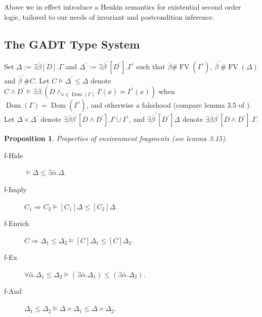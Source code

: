 \documentclass{article}
\newcommand{\assign}{:=}
\newcommand{\tmop}[1]{\ensuremath{\operatorname{#1}}}
\newtheorem{proposition}{Proposition}
\begin{document}
Above we in effect introduce a Henkin semantics for existential second order
logic, tailored to our needs of invariant and postcondition inference.

\subsection{The GADT Type System}\label{GADTProofs}

Set $\Delta \assign \exists \bar{\beta} [D] . \Gamma$ and $\Delta^{\prime}
\assign \exists \bar{\beta}^{\prime} [D^{\prime}] . \Gamma^{\prime}$ such that
$\bar{\beta} \# \tmop{FV} (\Gamma^{\prime})$, $\bar{\beta}^{\prime} \#
\tmop{FV} (\Delta)$ and $\bar{\beta}^{\prime} \#C$. Let $C \vDash
\Delta^{\prime} \leqslant \Delta$ denote $C \wedge D^{\prime} \vDash \exists
\bar{\beta} . (D \wedge_{x \in \tmop{Dom} (\Gamma)} \Gamma (x) \dot{=}
\Gamma^{\prime} (x))$ when $\tmop{Dom} (\Gamma) = \tmop{Dom}
(\Gamma^{\prime})$, and otherwise a falsehood (compare lemma 3.5 of
{\cite{simonet-pottier-hmg-toplas}}). Let $\Delta \times \Delta^{\prime}$
denote $\exists \bar{\beta} \overline{\beta^{\prime}} [D \wedge D^{\prime}] .
\Gamma \dot{\cup} \Gamma^{\prime}$, and $\exists \bar{\beta}^{\prime}
[D^{\prime}] \Delta$ denote $\exists \bar{\beta} \overline{\beta^{\prime}} [D
\wedge D^{\prime}] . \Gamma$.

\begin{proposition}
  \label{EnvFragProp}Properties of environment fragments (see
  {\cite{simonet-pottier-hmg-toplas}} lemma 3.15).
  \begin{description}
    \item[f-Hide] $\vDash \Delta \leqslant \exists \bar{\alpha} . \Delta$.
    
    \item[f-Imply] $C_1 \Rightarrow C_2 \vDash [C_1] \Delta \leqslant [C_2]
    \Delta$.
    
    \item[f-Enrich] $C \Rightarrow \Delta_1 \leqslant \Delta_2 \vDash [C]
    \Delta_1 \leqslant [C] \Delta_2$.
    
    \item[f-Ex] $\forall \bar{\alpha} . \Delta_1 \leqslant \Delta_2 \vDash
    (\exists \bar{\alpha} . \Delta_1) \leqslant (\exists \bar{\alpha} .
    \Delta_2)$.
    
    \item[f-And] $\Delta_1 \leqslant \Delta_2 \vDash \Delta \times \Delta_1
    \leqslant \Delta \times \Delta_2$.
  \end{description}
\end{proposition}
\end{document}
